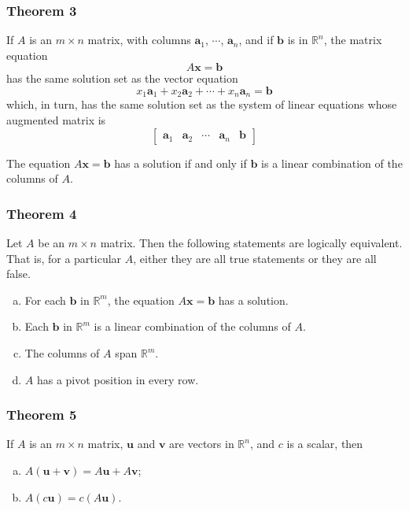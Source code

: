 \documentclass[letterpaper,11pt]{article}
\begin{document}
			\subsubsection{Theorem 3}
				If $A$ is an $m\times n$ matrix, with columns $\mathbf{a}_1$, $\cdots$, $\mathbf{a}_n$, and if $\mathbf{b}$ is in $\mathbb{R}^n$, the matrix equation
				\begin{equation}
					A\mathbf{x}=\mathbf{b}
				\end{equation}
				has the same solution set as the vector equation
				\begin{equation}
					x_1\mathbf{a}_1+x_2\mathbf{a}_2+\cdots+x_n\mathbf{a}_n=\mathbf{b}
				\end{equation}
				which, in turn, has the same solution set as the system of linear equations whose augmented matrix is
				\begin{equation}
					\begin{bmatrix}
						\mathbf{a}_1 & \mathbf{a}_2 & \cdots & \mathbf{a}_n & \mathbf{b}
					\end{bmatrix}
				\end{equation}
			
			The equation $A\mathbf{x}=\mathbf{b}$ has a solution if and only if $\mathbf{b}$ is a linear combination of the columns of $A$.
			
			\subsubsection{Theorem 4}
				Let $A$ be an $m\times n$ matrix. Then the following statements are logically equivalent. That is, for a particular $A$, either they are all true statements or they are all false.
				\begin{enumerate}[a.]
					\item For each $\mathbf{b}$ in $\mathbb{R}^m$, the equation $A\mathbf{x}=\mathbf{b}$ has a solution.
					\item Each $\mathbf{b}$ in $\mathbb{R}^m$ is a linear combination of the columns of $A$.
					\item The columns of $A$ span  $\mathbb{R}^m$.
					\item $A$ has a pivot position in every row.
				\end{enumerate}
			\subsubsection{Theorem 5}
				If $A$ is an $m\times n$ matrix, $\mathbf{u}$ and $\mathbf{v}$ are vectors in $\mathbb{R}^n$, and $c$ is a scalar, then
				\begin{enumerate}[a.]
					\item $A(\mathbf{u}+\mathbf{v})=A\mathbf{u}+A\mathbf{v}$;
					\item $A(c\mathbf{u})=c(A\mathbf{u})$.
				\end{enumerate}
\end{document}
